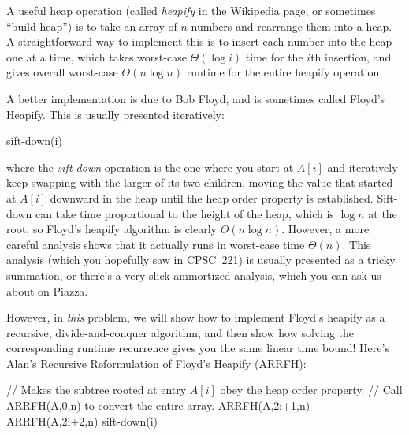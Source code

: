 \documentclass[11pt]{article}
\begin{document}
A useful heap operation (called \textit{heapify} in the Wikipedia page,
or sometimes ``build heap'') is to take an array of $n$ numbers and
rearrange them into a heap.  A straightforward way to implement this
is to insert each number into the heap one at a time,
which takes worst-case $\Theta(\log i)$
time for the $i$th insertion, and gives overall worst-case $\Theta(n\log n)$
runtime for the entire heapify operation.

A better implementation is due to Bob Floyd, and is sometimes called
Floyd's Heapify.  This is usually presented iteratively:
\begin{algorithmic}[1]
 
  \State sift-down(i) 
\EndFor
\EndFunction
\end{algorithmic}
where the \textit{sift-down} operation is the one where you start at
$A[i]$ and iteratively keep swapping with the larger of its two children,
moving the value that started at $A[i]$ downward in the heap until
the heap order property is established.  Sift-down can take time
proportional to the height of the heap, which is $\log n$ at the root,
so Floyd's heapify algorithm is clearly $O(n\log n)$.  However,
a more careful analysis shows that it actually runs in worst-case
time $\Theta(n)$.  This analysis (which you hopefully saw in CPSC~221)
is usually presented as a tricky summation, or there's a very slick
ammortized analysis, which you can ask us about on Piazza.

However, in \textit{this} problem, we will show how to implement
Floyd's heapify as a recursive, divide-and-conquer algorithm,
and then show how solving the corresponding runtime
recurrence gives you the same linear time bound!
Here's Alan's Recursive Reformulation of Floyd's Heapify (ARRFH):
\begin{algorithmic}[1]
\Statex // Makes the subtree rooted at entry $A[i]$ obey the heap order property.
\Statex // Call ARRFH(A,0,n) to convert the entire array.
  \Return {}
\EndIf
\State ARRFH(A,2i+1,n) 
\State ARRFH(A,2i+2,n) 
\State sift-down(i) 
\EndFunction
\end{algorithmic}
\end{document}
